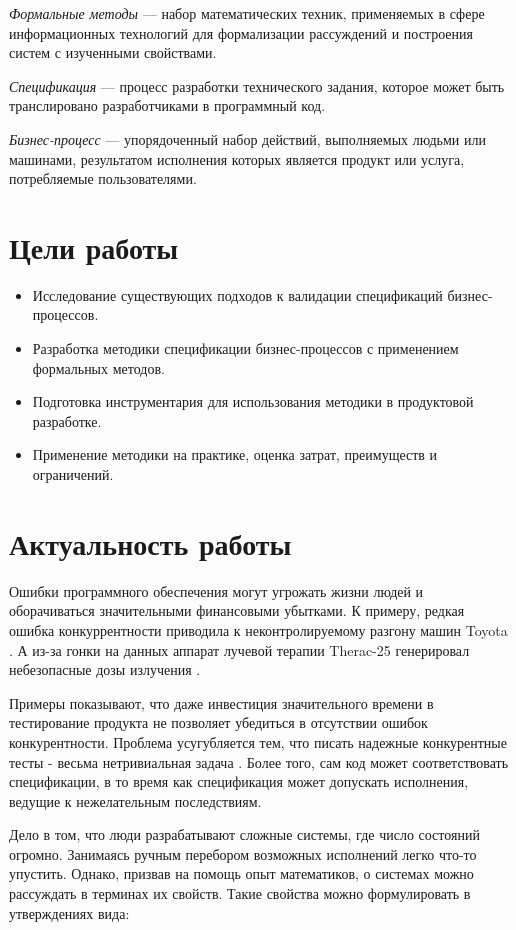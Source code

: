 \documentclass[14pt, openany]{book}
\begin{document}
\emph{Формальные методы} --- набор математических техник, применяемых в сфере информационных технологий для формализации рассуждений и построения систем с изученными свойствами. 

\emph{Спецификация} --- процесс разработки технического задания, которое может быть транслировано разработчиками в программный код.

\emph{Бизнес-процесс} --- упорядоченный набор действий, выполняемых людьми или машинами, результатом исполнения которых является продукт или услуга, потребляемые пользователями.

\section{Цели работы}

\begin{itemize}
  \item Исследование существующих подходов к валидации спецификаций бизнес-процессов.
  \item Разработка методики спецификации бизнес-процессов с применением формальных методов.
  \item Подготовка инструментария для использования методики в продуктовой разработке.
  \item Применение методики на практике, оценка затрат, преимуществ и ограничений.
\end{itemize}

\section{Актуальность работы}
Ошибки программного обеспечения могут угрожать жизни людей и оборачиваться значительными финансовыми убытками. К примеру, редкая ошибка конкуррентности приводила к неконтролируемому разгону машин Toyota \cite{toyota}. А из-за гонки на данных аппарат лучевой терапии Therac-25 генерировал небезопасные дозы излучения \cite{therac}.

Примеры показывают, что даже инвестиция значительного времени в тестирование продукта не позволяет убедиться в отсутствии ошибок конкурентности. Проблема усугубляется тем, что писать надежные конкурентные тесты - весьма нетривиальная задача \cite{xpConcurrent}. Более того, сам код может соответствовать спецификации, в то время как спецификация может допускать исполнения, ведущие к нежелательным последствиям. 

Дело в том, что люди разрабатывают сложные системы, где число состояний огромно. Занимаясь ручным перебором возможных исполнений легко что-то упустить. Однако, призвав на помощь опыт математиков, о системах можно рассуждать в терминах их свойств. Такие свойства можно формулировать в утверждениях вида:
\end{document}
